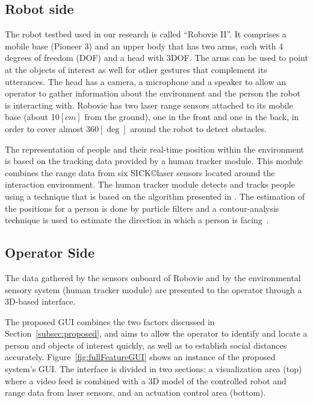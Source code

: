 \documentclass[a4paper, 10pt, conference]{ieeeconf}     %
\begin{document}
\subsection{Robot side}
\label{subsubsec:robotSide}
The robot testbed used in our research is called ``Robovie II''. 
It comprises a mobile base (Pioneer 3) and an upper body that has two arms, each with 4 degrees of freedom (DOF) and a head with 3DOF. 
The arms can be used to point at the objects of interest as well for other gestures that complement its utterances. 
The head has a camera, a microphone and a speaker to allow an operator to gather information about the environment and the person the robot is interacting with. 
Robovie has two laser range sensors attached to its mobile base (about 10$[cm]$ from the ground), one in the front and one in the back, in order to cover almost 360$[\deg]$ around the robot to detect obstacles.

The representation of people and their real-time position within the environment is based on the tracking data provided by a human tracker module. 
This module combines the range data from six SICK\copyright laser sensors located around the interaction environment. 
The human tracker module detects and tracks people using a technique that is based on the algorithm presented in \cite{glas:laser}. 
The estimation of the positions for a person is done by particle filters and a contour-analysis technique is used to estimate the direction in which a person is facing~\cite{glas:field}. 

\subsection{Operator Side}
The data gathered by the sensors onboard of Robovie and by the environmental sensory system (human tracker module) are presented to the operator through a 3D-based interface.

The proposed GUI combines the two factors discussed in Section~\ref{subsec:proposed}, and aims to allow the operator to identify and locate a person and objects of interest quickly, as well as to establish social distances accurately.
Figure~\ref{fig:fullFeatureGUI} shows an instance of the proposed system's GUI. The interface is divided in two sections: a visualization area (top) where a video feed is combined with a 3D model of the controlled robot and range data from laser sensors, and an actuation control area (bottom). 
\end{document}
